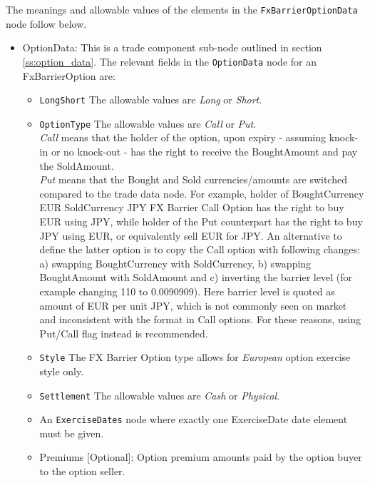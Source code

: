 The meanings and allowable values of the elements in the \lstinline!FxBarrierOptionData!  node follow below.

\begin{itemize}

\item OptionData: This is a trade component sub-node outlined in section \ref{ss:option_data}. 
The relevant fields in the \lstinline!OptionData! node for an FxBarrierOption are:

\begin{itemize}
\item \lstinline!LongShort! The allowable values are \emph{Long} or \emph{Short}.

\item \lstinline!OptionType! The allowable values are \emph{Call} or \emph{Put}. \\
 \emph{Call} means that the holder of the option, upon expiry - assuming knock-in or no knock-out - has the right to receive the BoughtAmount and pay the SoldAmount. \\\emph{Put} means that the Bought and Sold currencies/amounts are switched compared to the trade data node. 
For example, holder of BoughtCurrency EUR SoldCurrency JPY FX Barrier Call Option has the right to buy EUR using JPY, while
holder of the Put counterpart has the right to buy JPY using EUR, or equivalently sell EUR for JPY. An alternative to define the latter option is to copy the Call option with following changes:\\
a) swapping BoughtCurrency with SoldCurrency, b) swapping BoughtAmount with SoldAmount and c) inverting the barrier level (for example changing 110 to 0.0090909). Here barrier level is
quoted as amount of EUR per unit JPY, which is not commonly seen on market and inconsistent with the format in Call options. For these reasons, using Put/Call flag instead is recommended.

\item  \lstinline!Style! The FX Barrier Option type allows for \emph{European} option exercise style only.

\item  \lstinline!Settlement! The allowable values are \emph{Cash} or \emph{Physical}.

\item An \lstinline!ExerciseDates! node where exactly one ExerciseDate date element must be given.

\item Premiums [Optional]: Option premium amounts paid by the option buyer to the option seller.


\end{itemize}
\end{itemize}
